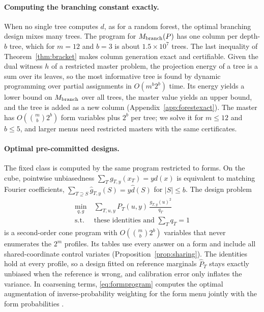 \documentclass{article}
\begin{document}
\paragraph{Computing the branching constant exactly.}
When no single tree computes $d$, as for a random forest, the optimal branching design mixes many trees. The program for $M_{\rm branch}(P)$ has one column per depth-$b$ tree, which for $m=12$ and $b=3$ is about $1.5\times10^7$ trees. The last inequality of Theorem~\ref{thm:bracket} makes column generation exact and certifiable. Given the dual witness $h$ of a restricted master problem, the projection energy of a tree is a sum over its leaves, so the most informative tree is found by dynamic programming over partial assignments in $O(m^b2^b)$ time. Its energy yields a lower bound on $M_{\rm branch}$ over all trees, the master value yields an upper bound, and the tree is added as a new column (Appendix~\ref{app:forestexact}). The master has $O(\binom mb2^b)$ form variables plus $2^b$ per tree; we solve it for $m\le12$ and $b\le5$, and larger menus need restricted masters with the same certificates.

\paragraph{Optimal pre-committed designs.}
The fixed class is computed by the same program restricted to forms. On the cube, pointwise unbiasedness $\sum_Tg_{T,y}(x_T)=yd(x)$ is equivalent to matching Fourier coefficients, $\sum_{T\supseteq S}\widehat g_{T,y}(S)=y\widehat d(S)$ for $|S|\le b$. The design problem
\begin{equation}
\begin{aligned}
 \min_{q,g}\ &\sum_{T,u,y}P_T(u,y)\,\frac{g_{T,y}(u)^2}{q_T}\\
 \text{s.t.}\ &\text{these identities and }\textstyle\sum_Tq_T=1
\end{aligned}\label{eq:formprogram}
\end{equation}
is a second-order cone program with $O(\binom mb2^b)$ variables that never enumerates the $2^m$ profiles. Its tables use every answer on a form and include all shared-coordinate control variates (Proposition~\ref{prop:sharing}). The identities hold at every profile, so a design fitted on reference marginals $\widehat P_T$ stays exactly unbiased when the reference is wrong, and calibration error only inflates the variance. In coarsening terms, \eqref{eq:formprogram} computes the optimal augmentation of inverse-probability weighting for the form menu jointly with the form probabilities \citep{robins1994,tsiatis2006}.
\end{document}
